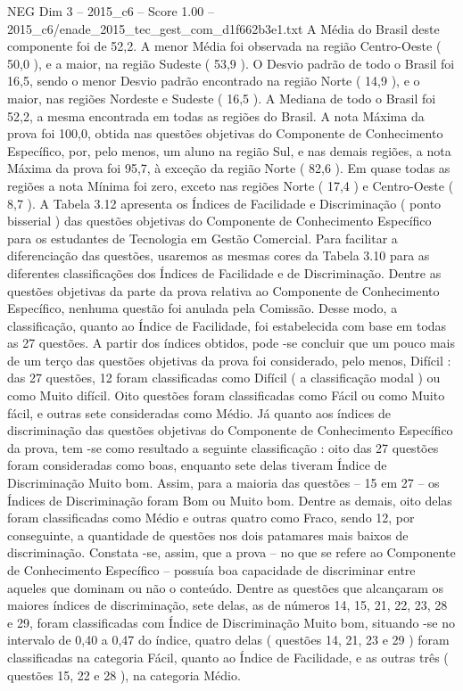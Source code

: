 \begin{textsample}{NEG Dim 3 – 2015\_c6 – Score 1.00 – 2015\_c6/enade\_2015\_tec\_gest\_com\_d1f662b3e1.txt}
A Média do Brasil deste componente foi de 52,2.
A menor Média foi observada na região Centro-Oeste ( 50,0 ), e a maior, na região Sudeste ( 53,9 ).
O Desvio padrão de todo o Brasil foi 16,5, sendo o menor Desvio padrão encontrado na região Norte ( 14,9 ), e o maior, nas regiões Nordeste e Sudeste ( 16,5 ).
A Mediana de todo o Brasil foi 52,2, a mesma encontrada em todas as regiões do Brasil.
A nota Máxima da prova foi 100,0, obtida nas questões objetivas do Componente de Conhecimento Específico, por, pelo menos, um aluno na região Sul, e nas demais regiões, a nota Máxima da prova foi 95,7, à exceção da região Norte ( 82,6 ).
Em quase todas as regiões a nota Mínima foi zero, exceto nas regiões Norte ( 17,4 ) e Centro-Oeste ( 8,7 ).
A Tabela 3.12 apresenta os Índices de Facilidade e Discriminação ( ponto bisserial ) das questões objetivas do Componente de Conhecimento Específico para os estudantes de Tecnologia em Gestão Comercial.
Para facilitar a diferenciação das questões, usaremos as mesmas cores da Tabela 3.10 para as diferentes classificações dos Índices de Facilidade e de Discriminação.
Dentre as questões objetivas da parte da prova relativa ao Componente de Conhecimento Específico, nenhuma questão foi anulada pela Comissão.
Desse modo, a classificação, quanto ao Índice de Facilidade, foi estabelecida com base em todas as 27 questões.
A partir dos índices obtidos, pode -se concluir que um pouco mais de um terço das questões objetivas da prova foi considerado, pelo menos, Difícil : das 27 questões, 12 foram classificadas como Difícil ( a classificação modal ) ou como Muito difícil.
Oito questões foram classificadas como Fácil ou como Muito fácil, e outras sete consideradas como Médio.
Já quanto aos índices de discriminação das questões objetivas do Componente de Conhecimento Específico da prova, tem -se como resultado a seguinte classificação : oito das 27 questões foram consideradas como boas, enquanto sete delas tiveram Índice de Discriminação Muito bom.
Assim, para a maioria das questões – 15 em 27 – os Índices de Discriminação foram Bom ou Muito bom.
Dentre as demais, oito delas foram classificadas como Médio e outras quatro como Fraco, sendo 12, por conseguinte, a quantidade de questões nos dois patamares mais baixos de discriminação.
Constata -se, assim, que a prova – no que se refere ao Componente de Conhecimento Específico – possuía boa capacidade de discriminar entre aqueles que dominam ou não o conteúdo.
Dentre as questões que alcançaram os maiores índices de discriminação, sete delas, as de números 14, 15, 21, 22, 23, 28 e 29, foram classificadas com Índice de Discriminação Muito bom, situando -se no intervalo de 0,40 a 0,47 do índice, quatro delas ( questões 14, 21, 23 e 29 ) foram classificadas na categoria Fácil, quanto ao Índice de Facilidade, e as outras três ( questões 15, 22 e 28 ), na categoria Médio.

\end{textsample}

